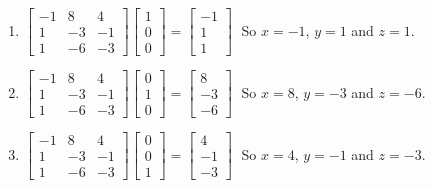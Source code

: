 \documentclass{ximera}
\begin{document}
\begin{enumerate}
\setcounter{enumi}{\value{HW}}

\item $\left[ \begin{array}{rrr} -1 & 8 & 4 \\ 1 & -3 & -1 \\ 1 & -6 & -3 \end{array} \right] \left[ \begin{array}{r} 1 \\ 0 \\ 0 \end{array} \right] = \left[ \begin{array}{r} -1 \\ 1 \\ 1 \end{array} \right] \;$ So $x = -1$, $y = 1$ and $z = 1$.
\item $\left[ \begin{array}{rrr} -1 & 8 & 4 \\ 1 & -3 & -1 \\ 1 & -6 & -3 \end{array} \right] \left[ \begin{array}{r} 0 \\ 1 \\ 0 \end{array} \right] = \left[ \begin{array}{r} 8 \\ -3 \\ -6 \end{array} \right] \;$ So $x = 8$, $y = -3$ and $z = -6$.
\item $\left[ \begin{array}{rrr} -1 & 8 & 4 \\ 1 & -3 & -1 \\ 1 & -6 & -3 \end{array} \right] \left[ \begin{array}{r} 0 \\ 0 \\ 1 \end{array} \right] = \left[ \begin{array}{r} 4 \\ -1 \\ -3 \end{array} \right] \;$ So $x = 4$, $y = -1$ and $z = -3$.

\setcounter{HW}{\value{enumi}}
\end{enumerate}
\end{document}
